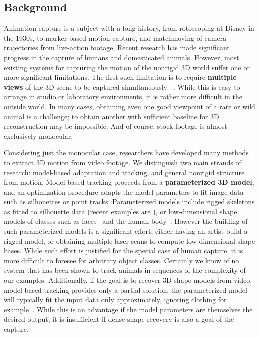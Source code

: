 \documentclass[preprint]{acmsiggraph}
\begin{document}
\subsection{Background}

Animation capture is a subject with a long history, from rotoscoping at Disney in the 1930s, to marker-based motion capture, and matchmoving of camera trajectories from live-action footage.   Recent research has made significant progress in the capture of humans and domesticated animals.   However, most existing systems for capturing the motion of the nonrigid 3D world suffer one or more significant limitations.   The first such limitation is to require {\bf multiple views} of the 3D scene to be captured simultaneously ~\cite{Vlasic:2008:AMA,Aguiar:2008:PCF,Gall:2009:MC}.  While this is easy to arrange in studio or laboratory environments, it is rather more difficult in the outside world.  In many cases, obtaining even one good viewpoint of a rare or wild animal is a challenge; to obtain another with sufficient baseline for 3D reconstruction may be impossible.   And of course, stock footage is almost exclusively monocular.   

Considering just the monocular case, researchers have developed many methods to extract 3D motion from video footage.  We distinguish two main strands of research:  model-based adaptation and tracking, and general nonrigid structure from motion.  Model-based tracking proceeds from a {\bf parameterized 3D model}, and an optimization procedure adapts the model parameters to fit image data such as silhouettes or point tracks.   Parameterized models include rigged skeletons as fitted to silhouette data (recent examples are \cite{Shih:2008:Cap,Gorce:2011:MB3,Ponsmoll11,Salzmann:2010:CDG}), or low-dimensional shape models of classes such as faces~\cite {Blanz:2003:RFI,Vlasic:2005:FTW} and the human body~\cite {Balan:2007:DHS}.
However the building of such parameterized models is a significant effort, either having an artist build a rigged model, or obtaining multiple laser scans to compute low-dimensional shape bases.
While such effort is justified for the special case of human capture, it is more difficult to foresee for arbitrary object classes.  Certainly we know of no system that has been shown to track animals in sequences of the complexity of our examples.
Additionally, if the goal is to recover 3D shape models from video, model-based tracking provides only a partial solution: the parameterized model will typically fit the input data only approximately, ignoring clothing for example~\cite{Balan:2007:DHS}.
While this is an advantage if the model parameters are themselves the desired output, it is insufficient if dense shape recovery is also a goal of the capture.
\end{document}
